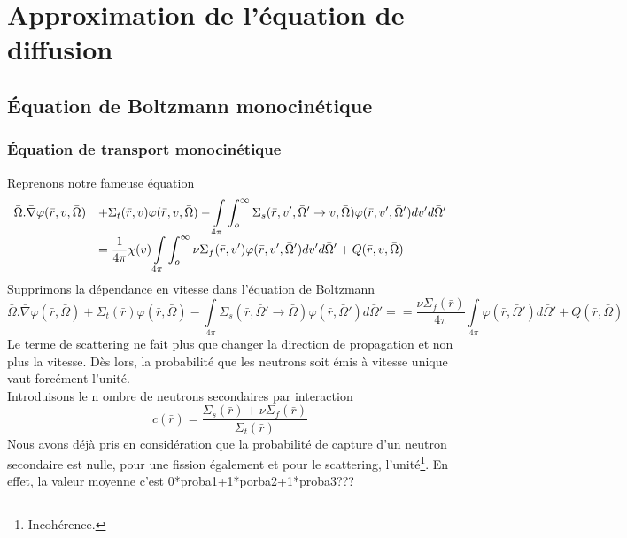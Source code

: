 \chapter{Approximation de l'équation de diffusion}
\section{Équation de Boltzmann monocinétique}
\subsection{Équation de transport monocinétique}
Reprenons notre fameuse équation
\begin{equation}
\begin{array}{ll}
\displaystyle\bar \Omega .\bar \nabla \varphi (\bar r,v,\bar \Omega ) &\displaystyle+ {\Sigma _t}(\bar r,v)\varphi (\bar r,v,\bar \Omega ) - \int\limits_{4\pi }    \int_o^\infty     {\Sigma _s}(\bar r,v',\bar \Omega ' \to v,\bar \Omega )\varphi (\bar r,v',\bar \Omega ')dv'd\bar \Omega '\\
&\displaystyle = \frac{1}{{4\pi }}\chi (v)\int\limits_{4\pi }    \int_o^\infty     \nu {\Sigma _f}(\bar r,v')\varphi (\bar r,v',\bar \Omega ')dv'd\bar \Omega ' + Q(\bar r,v,\bar \Omega )
\end{array}
\end{equation}
Supprimons la dépendance en vitesse dans l'équation de Boltzmann
\begin{equation}
\bar \Omega .\bar \nabla \varphi (\bar r,\bar \Omega ) + {\Sigma _t}(\bar r)\varphi (\bar r,\bar \Omega ) - \int\limits_{4\pi }   {\Sigma _s}(\bar r,\bar \Omega ' \to \bar \Omega )\varphi (\bar r,\bar \Omega ')d\bar \Omega '=  = \frac{{\nu {\Sigma _f}(\bar r)}}{{4\pi }}\int\limits_{4\pi }    \varphi (\bar r,\bar \Omega ')d\bar \Omega ' + Q(\bar r,\bar \Omega )
\end{equation}
Le terme de scattering ne fait plus que changer la direction de propagation et non plus la vitesse. Dès
lors, la probabilité que les neutrons soit émis à vitesse unique vaut forcément l'unité. \\

Introduisons le n ombre de neutrons secondaires par interaction
\begin{equation}
c(\bar r) = \frac{{{\Sigma _s}(\bar r) + \nu {\Sigma _f}(\bar r)}}{{{\Sigma _t}(\bar r)}}
\end{equation}
Nous avons déjà pris en considération que la probabilité de capture d'un neutron secondaire est 
nulle, pour une fission également et pour le scattering, l'unité\footnote{Incohérence.}. En effet, 
la valeur moyenne c'est 0*proba1+1*porba2+1*proba3???\\


